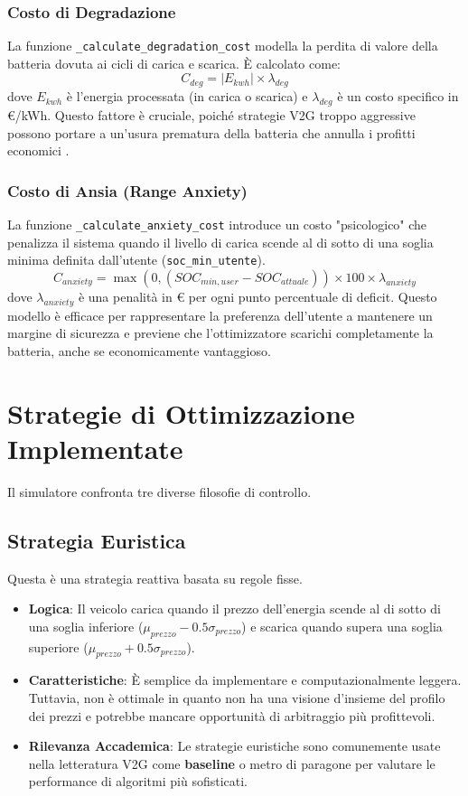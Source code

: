 \documentclass[a4paper, 11pt]{article}
\begin{document}
\subsubsection{Costo di Degradazione}
La funzione \texttt{\_calculate\_degradation\_cost} modella la perdita di valore della batteria dovuta ai cicli di carica e scarica. È calcolato come:
\begin{equation}
C_{deg} = |E_{kwh}| \times \lambda_{deg}
\end{equation}
dove \(E_{kwh}\) è l'energia processata (in carica o scarica) e \(\lambda_{deg}\) è un costo specifico in €/kWh. Questo fattore è cruciale, poiché strategie V2G troppo aggressive possono portare a un'usura prematura della batteria che annulla i profitti economici \cite{Uddin2018}.

\subsubsection{Costo di Ansia (Range Anxiety)}
La funzione \texttt{\_calculate\_anxiety\_cost} introduce un costo "psicologico" che penalizza il sistema quando il livello di carica scende al di sotto di una soglia minima definita dall'utente (\texttt{soc\_min\_utente}).
\begin{equation}
C_{anxiety} = \max(0, (SOC_{min,user} - SOC_{attuale})) \times 100 \times \lambda_{anxiety}
\end{equation}
dove \(\lambda_{anxiety}\) è una penalità in € per ogni punto percentuale di deficit. Questo modello è efficace per rappresentare la preferenza dell'utente a mantenere un margine di sicurezza e previene che l'ottimizzatore scarichi completamente la batteria, anche se economicamente vantaggioso.

\section{Strategie di Ottimizzazione Implementate}
Il simulatore confronta tre diverse filosofie di controllo.

\subsection{Strategia Euristica}
Questa è una strategia reattiva basata su regole fisse.
\begin{itemize}
    \item \textbf{Logica}: Il veicolo carica quando il prezzo dell'energia scende al di sotto di una soglia inferiore (\( \mu_{prezzo} - 0.5\sigma_{prezzo} \)) e scarica quando supera una soglia superiore (\( \mu_{prezzo} + 0.5\sigma_{prezzo} \)).
    \item \textbf{Caratteristiche}: È semplice da implementare e computazionalmente leggera. Tuttavia, non è ottimale in quanto non ha una visione d'insieme del profilo dei prezzi e potrebbe mancare opportunità di arbitraggio più profittevoli.
    \item \textbf{Rilevanza Accademica}: Le strategie euristiche sono comunemente usate nella letteratura V2G come \textbf{baseline} o metro di paragone per valutare le performance di algoritmi più sofisticati.
\end{itemize}
\end{document}

